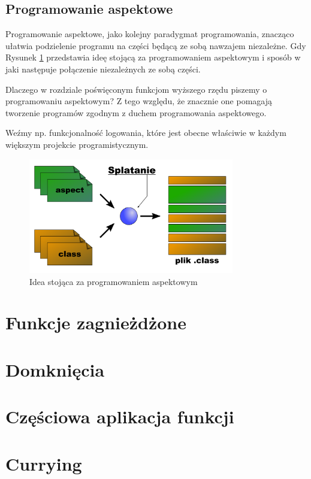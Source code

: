 \documentclass{pracamgr}
\begin{document}
\subsection{Programowanie aspektowe}

Programowanie aspektowe, jako kolejny paradygmat programowania, znacząco ułatwia podzielenie programu na części będącą ze sobą nawzajem niezależne. 
Gdy 
Rysunek \ref{fig:aspektProgramming} przedstawia ideę stojącą za programowaniem aspektowym i sposób w jaki następuje połączenie niezależnych ze sobą części. 

Dlaczego w rozdziale poświęconym funkcjom wyższego rzędu piszemy o programowaniu aspektowym? Z tego względu, że znacznie one pomagają tworzenie programów 
zgodnym z duchem programowania aspektowego. 

Weźmy np. funkcjonalność logowania, które jest obecne właściwie w każdym większym projekcie programistycznym.


\begin{figure}
  \centering
  \includegraphics[width=0.80\textwidth]{../images/aspektProgramming.png}
  \caption{Idea stojąca za programowaniem aspektowym}
  \label{fig:aspektProgramming}
\end{figure}

\section{Funkcje zagnieżdżone}
\section{Domknięcia}
\section{Częściowa aplikacja funkcji}
\section{Currying}
\end{document}
